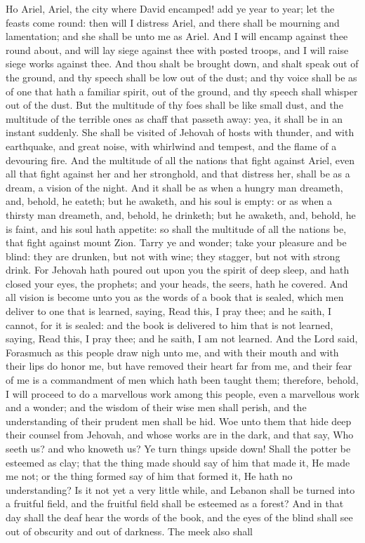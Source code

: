 Ho Ariel, Ariel, the city where David encamped! add ye year to year; let the feasts come round: then will I distress Ariel, and there shall be mourning and lamentation; and she shall be unto me as Ariel. And I will encamp against thee round about, and will lay siege against thee with posted troops, and I will raise siege works against thee. And thou shalt be brought down, and shalt speak out of the ground, and thy speech shall be low out of the dust; and thy voice shall be as of one that hath a familiar spirit, out of the ground, and thy speech shall whisper out of the dust.  But the multitude of thy foes shall be like small dust, and the multitude of the terrible ones as chaff that passeth away: yea, it shall be in an instant suddenly. She shall be visited of Jehovah of hosts with thunder, and with earthquake, and great noise, with whirlwind and tempest, and the flame of a devouring fire. And the multitude of all the nations that fight against Ariel, even all that fight against her and her stronghold, and that distress her, shall be as a dream, a vision of the night. And it shall be as when a hungry man dreameth, and, behold, he eateth; but he awaketh, and his soul is empty: or as when a thirsty man dreameth, and, behold, he drinketh; but he awaketh, and, behold, he is faint, and his soul hath appetite: so shall the multitude of all the nations be, that fight against mount Zion.  Tarry ye and wonder; take your pleasure and be blind: they are drunken, but not with wine; they stagger, but not with strong drink. For Jehovah hath poured out upon you the spirit of deep sleep, and hath closed your eyes, the prophets; and your heads, the seers, hath he covered. And all vision is become unto you as the words of a book that is sealed, which men deliver to one that is learned, saying, Read this, I pray thee; and he saith, I cannot, for it is sealed: and the book is delivered to him that is not learned, saying, Read this, I pray thee; and he saith, I am not learned.  And the Lord said, Forasmuch as this people draw nigh unto me, and with their mouth and with their lips do honor me, but have removed their heart far from me, and their fear of me is a commandment of men which hath been taught them; therefore, behold, I will proceed to do a marvellous work among this people, even a marvellous work and a wonder; and the wisdom of their wise men shall perish, and the understanding of their prudent men shall be hid.  Woe unto them that hide deep their counsel from Jehovah, and whose works are in the dark, and that say, Who seeth us? and who knoweth us? Ye turn things upside down! Shall the potter be esteemed as clay; that the thing made should say of him that made it, He made me not; or the thing formed say of him that formed it, He hath no understanding?  Is it not yet a very little while, and Lebanon shall be turned into a fruitful field, and the fruitful field shall be esteemed as a forest? And in that day shall the deaf hear the words of the book, and the eyes of the blind shall see out of obscurity and out of darkness. The meek also shall 